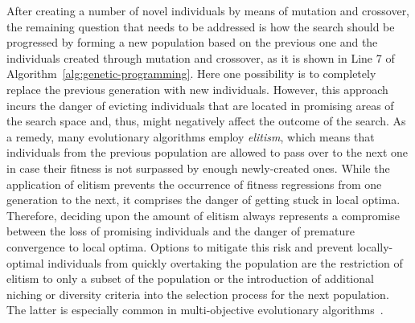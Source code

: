 After creating a number of novel individuals by means of mutation and crossover, the remaining question that needs to be addressed is how the search should be progressed by forming a new population based on the previous one and the individuals created through mutation and crossover, as it is shown in Line 7 of Algorithm~\ref{alg:genetic-programming}.
Here one possibility is to completely replace the previous generation with new individuals.
However, this approach incurs the danger of evicting individuals that are located in promising areas of the search space and, thus, might negatively affect the outcome of the search.
As a remedy, many evolutionary algorithms employ \emph{elitism}, which means that individuals from the previous population are allowed to pass over to the next one in case their fitness is not surpassed by enough newly-created ones.
While the application of elitism prevents the occurrence of fitness regressions from one generation to the next, it comprises the danger of getting stuck in local optima.
Therefore, deciding upon the amount of elitism always represents a compromise between the loss of promising individuals and the danger of premature convergence to local optima.
Options to mitigate this risk and prevent locally-optimal individuals from quickly overtaking the population are the restriction of elitism to only a subset of the population or the introduction of additional niching or diversity criteria into the selection process for the next population. 
The latter is especially common in multi-objective evolutionary algorithms~\cite{coello2007evolutionary}.